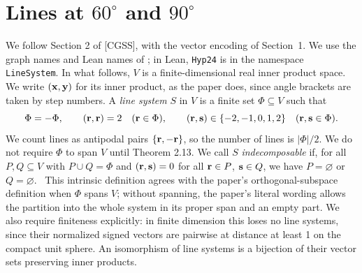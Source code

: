 \section{Lines at \texorpdfstring{$60^\circ$ and $90^\circ$}{60 and 90 degrees}}\label{sec:2}
\raggedbottom

We follow Section 2 of [CGSS], with the vector encoding of Section~1.
We use the graph names and Lean names of ; in Lean,
\texttt{Hyp24} is in the namespace \texttt{LineSystem}. In what follows,
$V$ is a finite-dimensional real inner product space. We write $({\mathbf x},{\mathbf y})$ for its inner
product, as the paper does, since angle brackets are taken by step numbers.
A \emph{line system} $S$ in $V$ is a finite set $\Phi\subseteq V$ such that
\[
 \Phi=-\Phi,\qquad ({\mathbf r},{\mathbf r})=2\quad({\mathbf r}\in\Phi),\qquad
 ({\mathbf r},{\mathbf s})\in\{-2,-1,0,1,2\}\quad({\mathbf r},{\mathbf s}\in\Phi).
\]
\label{def:line-system}\uses{}
We count lines as antipodal pairs $\{{\mathbf r},-{\mathbf r}\}$, so the number of lines is $|\Phi|/2$.
We do not require $\Phi$ to span $V$ until Theorem 2.13.
We call $S$ \emph{indecomposable} if, for all $P,Q\subseteq V$ with $P\cup Q=\Phi$ and
$({\mathbf r},{\mathbf s})=0$ for all ${\mathbf r}\in P$, ${\mathbf s}\in Q$, we have $P=\varnothing$ or $Q=\varnothing$.
\label{def:indecomposable}
\new\ This intrinsic definition agrees with the paper's orthogonal-subspace definition
when $\Phi$ spans $V$; without spanning, the paper's literal wording allows the partition
into the whole system in its proper span and an empty part. We also require finiteness
explicitly: in finite dimension this loses no line systems, since their normalized signed
vectors are pairwise at distance at least 1 on the compact unit sphere.
An isomorphism of line systems is a bijection of their vector sets preserving inner products.
\label{def:line-iso}

